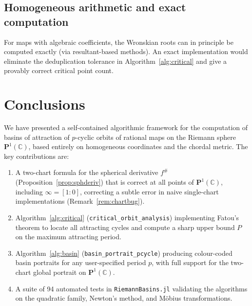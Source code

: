 \documentclass[12pt]{article}
\theoremstyle{definition}
\newcommand{\C}{\mathbb{C}}
\newcommand{\Pone}{\mathbf{P}^1(\C)}
\newcommand{\fsh}{f^{\#}}
\begin{document}
\subsection{Homogeneous arithmetic and exact computation}

For maps with algebraic coefficients, the Wronskian roots can in principle
be computed exactly (via resultant-based methods).  An exact
implementation would eliminate the deduplication tolerance in
Algorithm~\ref{alg:critical} and give a provably correct critical point
count.

\section{Conclusions}
\label{sec:conclusions}

We have presented a self-contained algorithmic framework for the computation
of basins of attraction of $p$-cyclic orbits of rational maps on the Riemann
sphere $\Pone$, based entirely on homogeneous coordinates and the chordal
metric.  The key contributions are:

\begin{enumerate}
  \item A two-chart formula for the spherical derivative $\fsh$
        (Proposition~\ref{prop:sphderiv}) that is correct at all points of
        $\Pone$, including $\infty=[1:0]$, correcting a subtle error in
        naive single-chart implementations (Remark~\ref{rem:chartbug}).

  \item Algorithm~\ref{alg:critical} (\texttt{critical\_orbit\_analysis})
        implementing Fatou's theorem to locate all attracting cycles and
        compute a sharp upper bound $P$ on the maximum attracting period.

  \item Algorithm~\ref{alg:basin} (\texttt{basin\_portrait\_pcycle})
        producing colour-coded basin portraits for any user-specified period
        $p$, with full support for the two-chart global portrait on $\Pone$.

  \item A suite of 94 automated tests in \texttt{RiemannBasins.jl}
        validating the algorithms on the quadratic family, Newton's method,
        and M\"obius transformations.
\end{enumerate}
\end{document}
